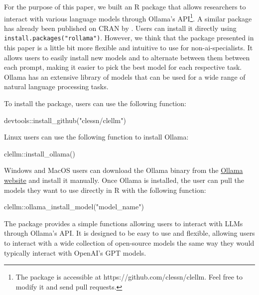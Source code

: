 \documentclass[
  authoryear,
  preprint,
  3p]{elsarticle}
\newenvironment{Shaded}{\begin{snugshade}}{\end{snugshade}}
\newcommand{\FunctionTok}[1]{\textcolor[rgb]{0.28,0.35,0.67}{#1}}
\newcommand{\NormalTok}[1]{\textcolor[rgb]{0.00,0.23,0.31}{#1}}
\newcommand{\SpecialCharTok}[1]{\textcolor[rgb]{0.37,0.37,0.37}{#1}}
\newcommand{\StringTok}[1]{\textcolor[rgb]{0.13,0.47,0.30}{#1}}
\begin{document}
For the purpose of this paper, we built an R package that allows
researchers to interact with various language models through Ollama's
API\footnote{The package is accessible at
  https://github.com/clessn/clellm. Feel free to modify it and send pull
  requests.}. A similar package has already been published on CRAN by
\citet{gruber_weber24}. Users can install it directly using
\texttt{install.packages("rollama")}. However, we think that the package
presented in this paper is a little bit more flexible and intuitive to
use for non-ai-specialists. It allows users to easily install new models
and to alternate between them between each prompt, making it easier to
pick the best model for each respective task. Ollama has an extensive
library of models that can be used for a wide range of natural language
processing tasks.

To install the package, users can use the following function:

\begin{Shaded}
\begin{Highlighting}[]
\NormalTok{devtools}\SpecialCharTok{::}\FunctionTok{install\_github}\NormalTok{(}\StringTok{"clessn/clellm"}\NormalTok{)}
\end{Highlighting}
\end{Shaded}

Linux users can use the following function to install Ollama:

\begin{Shaded}
\begin{Highlighting}[]
\NormalTok{clellm}\SpecialCharTok{::}\FunctionTok{install\_ollama}\NormalTok{()}
\end{Highlighting}
\end{Shaded}

Windows and MacOS users can download the Ollama binary from the
\href{https://ollama.com/}{Ollama website} and install it manually. Once
Ollama is installed, the user can pull the models they want to use
directly in R with the following function:

\begin{Shaded}
\begin{Highlighting}[]
\NormalTok{clellm}\SpecialCharTok{::}\FunctionTok{ollama\_install\_model}\NormalTok{(}\StringTok{"model\_name"}\NormalTok{)}
\end{Highlighting}
\end{Shaded}

The package provides a simple functions allowing users to interact with
LLMs through Ollama's API. It is designed to be easy to use and
flexible, allowing users to interact with a wide collection of
open-source models the same way they would typically interact with
OpenAI's GPT models.
\end{document}
